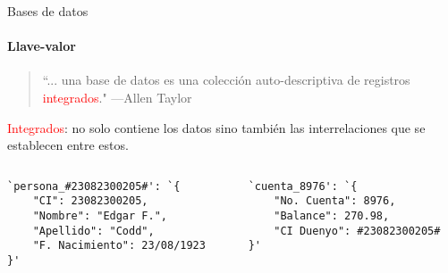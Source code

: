 \begin{frame}[fragile]{Bases de datos}
    \framesubtitle{Llave-valor}

    \begin{overlayarea}{\linewidth}{\textheight}
        \begin{onlyenv}
            \begin{block}{}
                \begin{quote}
                    ``... una base de datos es una colecci\'on auto-descriptiva de registros \textcolor{red}{integrados}."
                    \hspace{1em plus 1fill}---Allen Taylor
                \end{quote}
                \textcolor{red}{Integrados}: no solo contiene los datos sino tambi\'en las interrelaciones
                 que se establecen entre estos.
            \end{block}
      \end{onlyenv}

      \vspace{5mm}
        \begin{columns}
            \begin{column}[t]{0.5\textwidth}
                \centering

                \begin{lstlisting}[language=text]
`persona_#23082300205#': `{  
    "CI": 23082300205, 
    "Nombre": "Edgar F.", 
    "Apellido": "Codd", 
    "F. Nacimiento": 23/08/1923 
}'
                \end{lstlisting} 
            \end{column}

            \begin{column}[t]{0.5\textwidth}
                \centering

                \begin{lstlisting}[language=text]
`cuenta_8976': `{  
    "No. Cuenta": 8976, 
    "Balance": 270.98, 
    "CI Duenyo": #23082300205#
}'
                \end{lstlisting} 
            \end{column}
        \end{columns}
    \end{overlayarea}
    
\end{frame}
